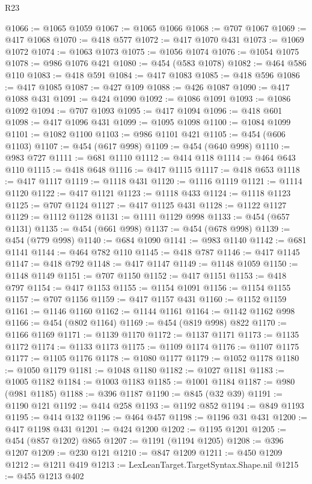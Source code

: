 \begin{lexlean}{R23}
\begin{coremodule}
@1066 := @1065 @1059
@1067 := @1065 @1066
@1068 := @707 @1067
@1069 := @417 @1068
@1070 := @418 @577
@1072 := @417 @1070 @431
@1073 := @1069 @1072
@1074 := @1063 @1073
@1075 := @1056 @1074
@1076 := @1054 @1075
@1078 := @986 @1076 @421
@1080 := @454 (@583 @1078)
@1082 := @464 @586 @110
@1083 := @418 @591
@1084 := @417 @1083
@1085 := @418 @596
@1086 := @417 @1085
@1087 := @427 @109
@1088 := @426 @1087
@1090 := @417 @1088 @431
@1091 := @424 @1090
@1092 := @1086 @1091
@1093 := @1086 @1092
@1094 := @707 @1093
@1095 := @417 @1094
@1096 := @418 @601
@1098 := @417 @1096 @431
@1099 := @1095 @1098
@1100 := @1084 @1099
@1101 := @1082 @1100
@1103 := @986 @1101 @421
@1105 := @454 (@606 @1103)
@1107 := @454 (@617 @998)
@1109 := @454 (@640 @998)
@1110 := @983 @727
@1111 := @681 @1110
@1112 := @414 @118
@1114 := @464 @643 @110
@1115 := @418 @648
@1116 := @417 @1115
@1117 := @418 @653
@1118 := @417 @1117
@1119 := @1118 @431
@1120 := @1116 @1119
@1121 := @1114 @1120
@1122 := @417 @1121
@1123 := @1118 @433
@1124 := @1118 @1123
@1125 := @707 @1124
@1127 := @417 @1125 @431
@1128 := @1122 @1127
@1129 := @1112 @1128
@1131 := @1111 @1129 @998
@1133 := @454 (@657 @1131)
@1135 := @454 (@661 @998)
@1137 := @454 (@678 @998)
@1139 := @454 (@779 @998)
@1140 := @684 @1090
@1141 := @983 @1140
@1142 := @681 @1141
@1144 := @464 @782 @110
@1145 := @418 @787
@1146 := @417 @1145
@1147 := @418 @792
@1148 := @417 @1147
@1149 := @1148 @1059
@1150 := @1148 @1149
@1151 := @707 @1150
@1152 := @417 @1151
@1153 := @418 @797
@1154 := @417 @1153
@1155 := @1154 @1091
@1156 := @1154 @1155
@1157 := @707 @1156
@1159 := @417 @1157 @431
@1160 := @1152 @1159
@1161 := @1146 @1160
@1162 := @1144 @1161
@1164 := @1142 @1162 @998
@1166 := @454 (@802 @1164)
@1169 := @454 (@819 @998) @822
@1170 := @1166 @1169
@1171 := @1139 @1170
@1172 := @1137 @1171
@1173 := @1135 @1172
@1174 := @1133 @1173
@1175 := @1109 @1174
@1176 := @1107 @1175
@1177 := @1105 @1176
@1178 := @1080 @1177
@1179 := @1052 @1178
@1180 := @1050 @1179
@1181 := @1048 @1180
@1182 := @1027 @1181
@1183 := @1005 @1182
@1184 := @1003 @1183
@1185 := @1001 @1184
@1187 := @980 (@981 @1185)
@1188 := @396 @1187
@1190 := @845 (@32 @39)
@1191 := @1190 @121
@1192 := @414 @258
@1193 := @1192 @852
@1194 := @849 @1193
@1195 := @414 @132
@1196 := @464 @457
@1198 := @1196 @31 @431
@1200 := @417 @1198 @431
@1201 := @424 @1200
@1202 := @1195 @1201
@1205 := @454 (@857 @1202) @865
@1207 := @1191 (@1194 @1205)
@1208 := @396 @1207
@1209 := @230 @121
@1210 := @847 @1209
@1211 := @450 @1209
@1212 := @1211 @419
@1213 := LexLeanTarget.TargetSyntax.Shape.nil
@1215 := @455 @1213 @402

\end{coremodule}
\end{lexlean}
